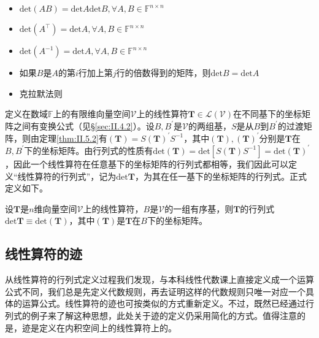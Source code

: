 \documentclass[main.tex]{subfiles}
\begin{document}
\begin{theorem}
\quad
\begin{itemize}
    \item $\mathrm{det}\left(AB\right)=\mathrm{det}A\mathrm{det}B,\forall A,B\in\mathbb{F}^{n\times n}$
    \item $\mathrm{det}\left(A^\intercal\right)=\mathrm{det}A,\forall A,B\in\mathbb{F}^{n\times n}$
    \item $\mathrm{det}\left(A^{-1}\right)=\mathrm{det}A,\forall A,B\in\mathbb{F}^{n\times n}$
    \item 如果$B$是$A$的第$i$行加上第$j$行的倍数得到的矩阵，则$\mathrm{det}B=\mathrm{det}A$
    \item 克拉默法则\cite[\S1.5,p.~15]{周胜林2012线性代数}
\end{itemize}
\end{theorem}

定义在数域$\mathbb{F}$上的有限维向量空间$\mathcal{V}$上的线性算符$\mathbf{T}\in\mathcal{L}\left(\mathcal{V}\right)$在不同基下的坐标矩阵之间有变换公式（见\S\ref{sec:II.4.2}）。设$B,B^\prime$是$\mathcal{V}$的两组基，$S$是从$B$到$B^\prime$的过渡矩阵，则由定理\ref{thm:II.5.2}有$\left(\mathbf{T}\right)=S\left(\mathbf{T}\right)^\prime S^{-1}$，其中$\left(\mathbf{T}\right),\left(\mathbf{T}\right)^\prime$分别是$\mathbf{T}$在$B,B^\prime$下的坐标矩阵。由行列式的性质有$\mathrm{det}\left(\mathbf{T}\right)=\mathrm{det}\left[S\left(\mathbf{T}\right)S^{-1}\right]=\mathrm{det}\left(\mathbf{T}\right)^\prime$，因此一个线性算符在任意基下的坐标矩阵的行列式都相等，我们因此可以定义“线性算符的行列式”，记为$\mathrm{det}\mathbf{T}$，为其在任一基下的坐标矩阵的行列式。正式定义如下。

\begin{definition}[线性算符的行列式]
设$\mathbf{T}$是$n$维向量空间$\mathcal{V}$上的线性算符，$B$是$\mathcal{V}$的一组有序基，则$\mathbf{T}$的行列式$\mathrm{det}\mathbf{T}\equiv\mathrm{det}\left(\mathbf{T}\right)$，其中$\left(\mathbf{T}\right)$是$\mathbf{T}$在$B$下的坐标矩阵。
\end{definition}

\subsection{线性算符的迹}
从线性算符的行列式定义过程我们发现，与本科线性代数课上直接定义成一个运算公式不同，我们总是先定义代数规则，再去证明这样的代数规则只唯一对应一个具体的运算公式。线性算符的迹也可按类似的方式重新定义。不过，既然已经通过行列式的例子来了解这种思想，此处关于迹的定义仍采用简化的方式。值得注意的是，迹是定义在内积空间上的线性算符上的。
\end{document}
